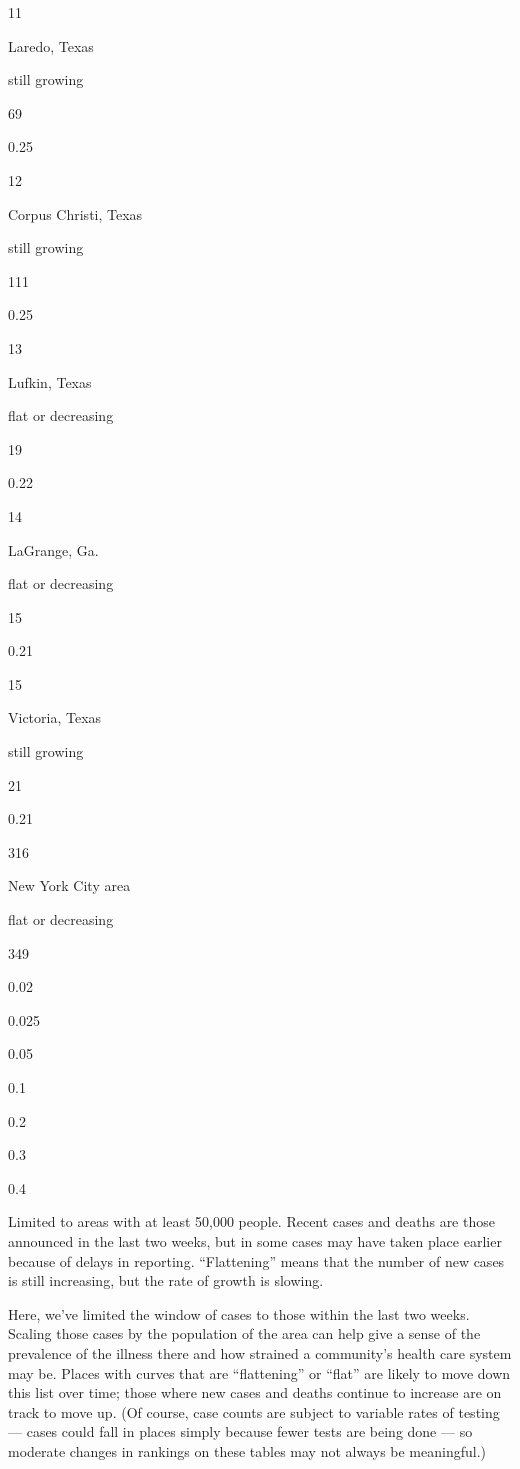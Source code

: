11

Laredo, Texas

still growing

69

0.25

12

Corpus Christi, Texas

still growing

111

0.25

13

Lufkin, Texas

flat or decreasing

19

0.22

14

LaGrange, Ga.

flat or decreasing

15

0.21

15

Victoria, Texas

still growing

21

0.21

316

New York City area

flat or decreasing

349

0.02

0.025

0.05

0.1

0.2

0.3

0.4

Limited to areas with at least 50,000 people. Recent cases and deaths
are those announced in the last two weeks, but in some cases may have
taken place earlier because of delays in reporting. ``Flattening'' means
that the number of new cases is still increasing, but the rate of growth
is slowing.

Here, we've limited the window of cases to those within the last two
weeks. Scaling those cases by the population of the area can help give a
sense of the prevalence of the illness there and how strained a
community's health care system may be. Places with curves that are
``flattening'' or ``flat'' are likely to move down this list over time;
those where new cases and deaths continue to increase are on track to
move up. (Of course, case counts are subject to variable rates of
testing --- cases could fall in places simply because fewer tests are
being done --- so moderate changes in rankings on these tables may not
always be meaningful.)

